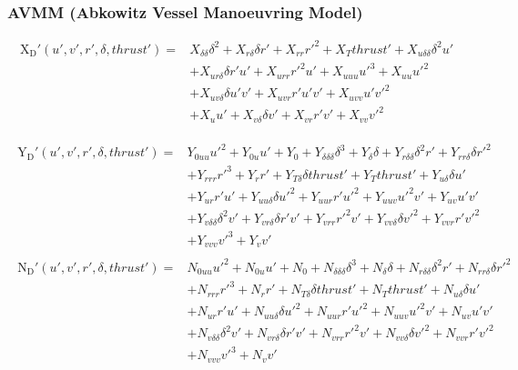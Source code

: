 \subsubsection*{AVMM (Abkowitz Vessel Manoeuvring Model) \cite{abkowitz_ship_1964}}
\begin{equation}\label{equation:02.01_manoeuvring models:eqxabkowitz}
\begin{split}
\operatorname{X_{D}'}{\left(u',v',r',\delta,thrust' \right)} = & X_{\delta\delta} \delta^{2} + X_{r\delta} \delta r' + X_{rr} r'^{2} + X_{T} thrust' + X_{u\delta\delta} \delta^{2} u' \\ 
& + X_{ur\delta} \delta r' u' + X_{urr} r'^{2} u' + X_{uuu} u'^{3} + X_{uu} u'^{2} \\ 
& + X_{uv\delta} \delta u' v' + X_{uvr} r' u' v' + X_{uvv} u' v'^{2} \\
& + X_{u} u' + X_{v\delta} \delta v' + X_{vr} r' v' + X_{vv} v'^{2} 
\end{split}
\end{equation}

\begin{equation}\label{equation:02.01_manoeuvring models:eqyabkowitz}
\begin{split}\begin{split}
\operatorname{Y_{D}'}{\left(u',v',r',\delta,thrust' \right)} = & Y_{0uu} u'^{2} + Y_{0u} u' + Y_{0} + Y_{\delta\delta\delta} \delta^{3} + Y_{\delta} \delta + Y_{r\delta\delta} \delta^{2} r' + Y_{rr\delta} \delta r'^{2} \\ & + Y_{rrr} r'^{3} + Y_{r} r' + Y_{T\delta} \delta thrust' + Y_{T} thrust' + Y_{u\delta} \delta u' \\ & + Y_{ur} r' u' + Y_{uu\delta} \delta u'^{2} + Y_{uur} r' u'^{2} + Y_{uuv} u'^{2} v' + Y_{uv} u' v' \\ & + Y_{v\delta\delta} \delta^{2} v' + Y_{vr\delta} \delta r' v' + Y_{vrr} r'^{2} v' + Y_{vv\delta} \delta v'^{2} + Y_{vvr} r' v'^{2} \\ & + Y_{vvv} v'^{3} + Y_{v} v' 
\end{split}\end{split}
\end{equation}\begin{equation}\label{equation:02.01_manoeuvring models:eqnabkowitz}
\begin{split}\begin{split}
\operatorname{N_{D}'}{\left(u',v',r',\delta,thrust' \right)} = & N_{0uu} u'^{2} + N_{0u} u' + N_{0} + N_{\delta\delta\delta} \delta^{3} + N_{\delta} \delta + N_{r\delta\delta} \delta^{2} r' + N_{rr\delta} \delta r'^{2} \\ & + N_{rrr} r'^{3} + N_{r} r' + N_{T\delta} \delta thrust' + N_{T} thrust' + N_{u\delta} \delta u' \\ & + N_{ur} r' u' + N_{uu\delta} \delta u'^{2} + N_{uur} r' u'^{2} + N_{uuv} u'^{2} v' + N_{uv} u' v' \\ & + N_{v\delta\delta} \delta^{2} v' + N_{vr\delta} \delta r' v' + N_{vrr} r'^{2} v' + N_{vv\delta} \delta v'^{2} + N_{vvr} r' v'^{2} \\ & + N_{vvv} v'^{3} + N_{v} v' 
\end{split}\end{split}
\end{equation}
\sphinxAtStartPar
